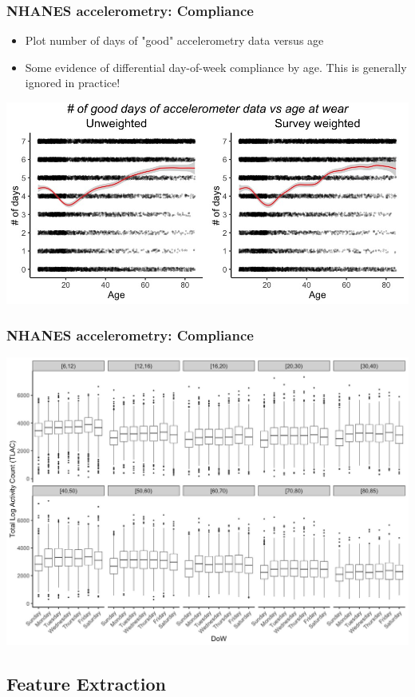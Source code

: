 \documentclass[10pt]{beamer}\usepackage[]{graphicx}\usepackage[]{color}
\begin{document}
\begin{frame}
\frametitle{NHANES accelerometry: Compliance}
\begin{itemize}
\item Plot number of days of "good" accelerometry data versus age
\item Some evidence of differential day-of-week compliance by age. This is generally ignored in practice! 
\end{itemize}
\begin{center}
\includegraphics[width=\textwidth]{ndays_accel_by_age}
\end{center}
\end{frame}


\begin{frame}
\frametitle{NHANES accelerometry: Compliance}
\includegraphics[width=\textwidth]{TLAC_by_age_category}
\end{frame}





\subsection{Feature Extraction}
\end{document}
